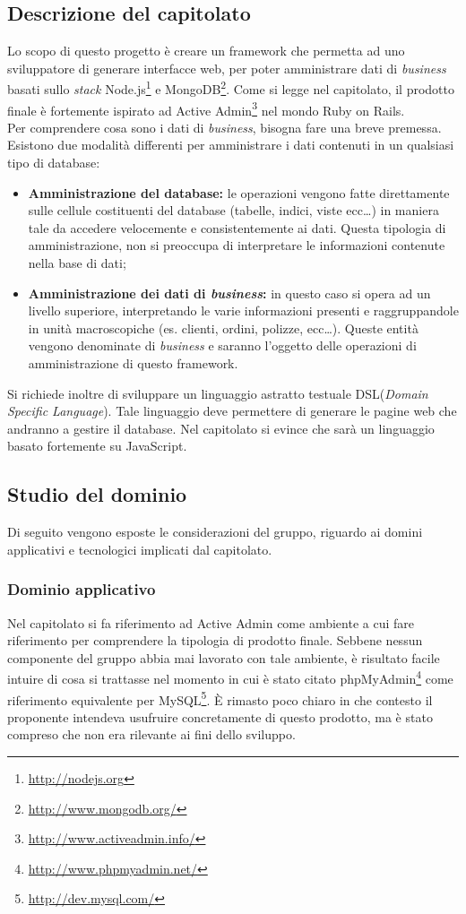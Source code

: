 \subsection{Descrizione del capitolato}
\label{descrizionecapitolato1}
Lo scopo di questo progetto è creare un framework\glossario{} che permetta ad uno sviluppatore di generare interfacce web, per poter amministrare dati di \textit{business} basati sullo \textit{stack} Node.js\footnote{\url{http://nodejs.org}} e MongoDB\footnote{\url{http://www.mongodb.org/}}. Come si legge nel capitolato, il prodotto finale è fortemente ispirato ad Active Admin\footnote{\url{http://www.activeadmin.info/}} nel mondo Ruby on Rails.
\\ Per comprendere cosa sono i dati di \textit{business}, bisogna fare una breve premessa. Esistono due modalità differenti per amministrare i dati contenuti in un qualsiasi tipo di database:
\begin{itemize}
\item\textbf{Amministrazione del database:} le operazioni vengono fatte direttamente sulle cellule costituenti del database (tabelle, indici, viste ecc\dots) in maniera tale da accedere velocemente e consistentemente ai dati. Questa tipologia di amministrazione, non si preoccupa di interpretare le informazioni contenute nella base di dati;
\item\textbf{Amministrazione dei dati di \textit{business}:} in questo caso si opera ad un livello superiore, interpretando le varie informazioni presenti e raggruppandole in unità macroscopiche (es. clienti, ordini, polizze, ecc\dots). Queste entità vengono denominate di \textit{business} e saranno l'oggetto delle operazioni di amministrazione di questo framework\glossario{}.
\end{itemize}
Si richiede inoltre di sviluppare un linguaggio astratto testuale DSL(\textit{Domain Specific Language}). Tale linguaggio deve permettere di generare le pagine web che andranno a gestire il database. Nel capitolato si evince che sarà un linguaggio basato fortemente su JavaScript.

\subsection{Studio del dominio}
\label{dominiocap1}
Di seguito vengono esposte le considerazioni del gruppo, riguardo ai domini applicativi e tecnologici implicati dal capitolato.

\subsubsection{Dominio applicativo}
\label{dominioapp1}
Nel capitolato si fa riferimento ad Active Admin come ambiente a cui fare riferimento per comprendere la tipologia di prodotto finale. Sebbene nessun componente del gruppo abbia mai lavorato con tale ambiente, è risultato facile intuire di cosa si trattasse nel momento in cui è stato citato phpMyAdmin\footnote{\url{http://www.phpmyadmin.net/}} come riferimento equivalente per MySQL\footnote{\url{http://dev.mysql.com/}}. \`E rimasto poco chiaro in che contesto il proponente intendeva usufruire concretamente di questo prodotto, ma è stato compreso che non era rilevante ai fini dello sviluppo.

